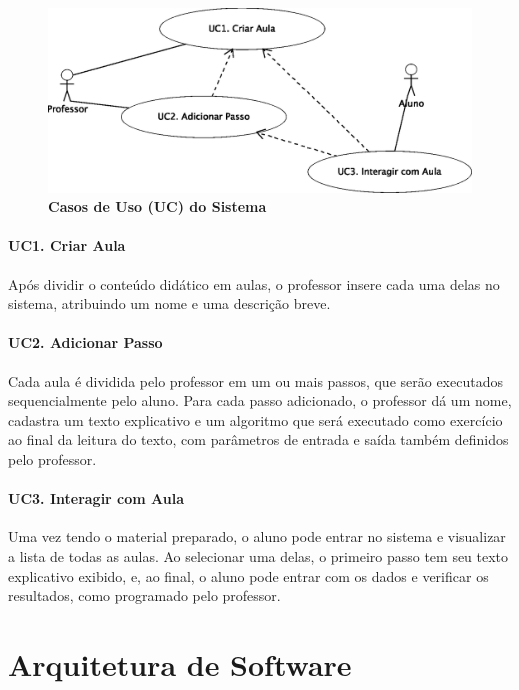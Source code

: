 \documentclass{abnt}
\begin{document}
\begin{figure}[htbp]
\begin{center}
\includegraphics[scale=0.75]{casos.eps}


	\caption{{\bf Casos de Uso (UC) do Sistema}}
\label{casos}
\end{center}
\end{figure}

\subsubsection{UC1. Criar Aula}

	Após dividir o conteúdo didático em aulas, o professor insere cada uma delas no sistema, atribuindo um nome e uma descrição breve.
\subsubsection{UC2. Adicionar Passo}
Cada aula é dividida pelo professor em um ou mais passos, que serão executados sequencialmente pelo aluno. Para cada passo adicionado, o professor dá um nome, cadastra um texto explicativo e um algoritmo que será executado como exercício ao final da leitura do texto, com parâmetros de entrada e saída também definidos pelo professor.
\subsubsection{UC3. Interagir com Aula}
Uma vez tendo o material preparado, o aluno pode entrar no sistema e visualizar a lista de todas as aulas. Ao selecionar uma delas, o primeiro passo tem seu texto explicativo exibido, e, ao final, o aluno pode entrar com os dados e verificar os resultados, como programado pelo professor.



\chapter {Arquitetura de Software}
\end{document}
